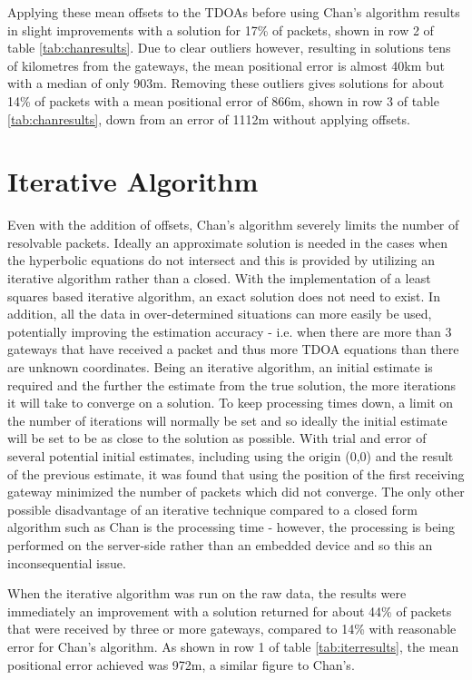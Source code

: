 \documentclass[a4paper]{report}
\begin{document}
    Applying these mean offsets to the TDOAs before using Chan's algorithm results in slight improvements with a solution for 17\% of packets, shown in row 2 of table \ref{tab:chanresults}. Due to clear outliers however, resulting in solutions tens of kilometres from the gateways, the mean positional error is almost 40km but with a median of only 903m. Removing these outliers gives solutions for about 14\% of packets with a mean positional error of 866m, shown in row 3 of table \ref{tab:chanresults}, down from an error of 1112m without applying offsets.


  \section{Iterative Algorithm}

    Even with the addition of offsets, Chan's algorithm severely limits the number of resolvable packets. Ideally an approximate solution is needed in the cases when the hyperbolic equations do not intersect and this is provided by utilizing an iterative algorithm rather than a closed. With the implementation of a least squares based iterative algorithm, an exact solution does not need to exist. In addition, all the data in over-determined situations can more easily be used, potentially improving the estimation accuracy - i.e. when there are more than 3 gateways that have received a packet and thus more TDOA equations than there are unknown coordinates. Being an iterative algorithm, an initial estimate is required and the further the estimate from the true solution, the more iterations it will take to converge on a solution. To keep processing times down, a limit on the number of iterations will normally be set and so ideally the initial estimate will be set to be as close to the solution as possible. With trial and error of several potential initial estimates, including using the origin (0,0) and the result of the previous estimate, it was found that using the position of the first receiving gateway minimized the number of packets which did not converge. The only other possible disadvantage of an iterative technique compared to a closed form algorithm such as Chan is the processing time - however, the processing is being performed on the server-side rather than an embedded device and so this an inconsequential issue.

    When the iterative algorithm was run on the raw data, the results were immediately an improvement with a solution returned for about 44\% of packets that were received by three or more gateways, compared to 14\% with reasonable error for Chan's algorithm. As shown in row 1 of table \ref{tab:iterresults}, the mean positional error achieved was 972m, a similar figure to Chan's.
\end{document}

